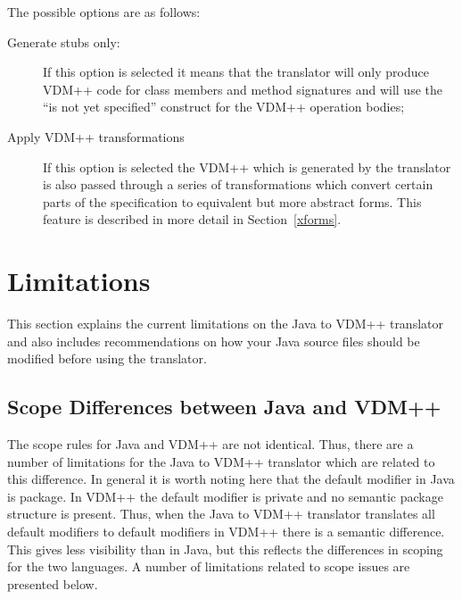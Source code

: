 \documentclass[\pformat,12pt]{article}
\begin{document}
The possible options are as follows:
\begin{description}
\item[Generate stubs only:]
If this option is selected it means that the translator will only
produce VDM++ code for class members and method signatures and will
use the ``is not yet specified'' construct for the VDM++ operation
bodies; 
\item[Apply VDM++ transformations] If this option is selected the
  VDM++ which is generated by the translator is also passed through a
  series of transformations which convert certain parts of the
  specification to equivalent but more abstract forms. This feature is
  described in more detail in Section~\ref{xforms}. 
\end{description}

\section{Limitations}\label{limitations}

This section explains the current limitations on the Java to VDM++
translator and also includes recommendations on how your Java
source files should be modified before using the translator.

\subsection{Scope Differences between Java and VDM++}

The scope rules for Java and VDM++ are not identical. Thus, there are
a number of limitations for the Java to VDM++ translator which are
related to this difference. In general it is worth noting here that
the default modifier in Java is package. In VDM++ the default modifier
is private and no semantic package structure is present. Thus, when
the Java to VDM++ translator translates all default modifiers to
default modifiers in VDM++ there is a semantic difference. This gives
less visibility than in Java, but this reflects the differences in
scoping for the two languages. A number of limitations related
to scope issues are presented below.
\end{document}

